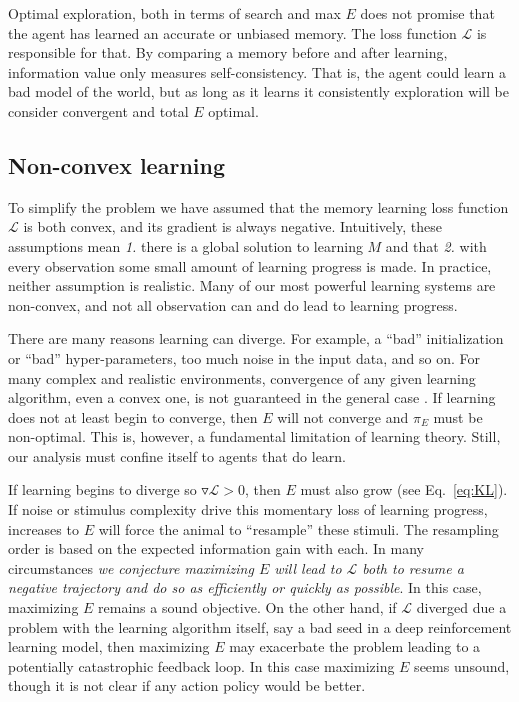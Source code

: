 \documentclass[9pt,twocolumn,twoside]{pnas-new}
\begin{document}
Optimal exploration, both in terms of search and max $E$ does not promise that the agent has learned an accurate or unbiased memory. The loss function $\mathcal{L}$ is responsible for that. By comparing a memory before and after learning, information value only measures self-consistency. That is, the agent could learn a bad model of the world, but as long as it learns it consistently exploration will be consider convergent and total $E$ optimal.

\subsection*{Non-convex learning}
To simplify the problem we have assumed that the memory learning loss function $\mathcal{L}$ is both convex, and its gradient is always negative. Intuitively, these assumptions mean \textit{1.} there is a global solution to learning $M$ and that \textit{2.} with every observation some small amount of learning progress is made. In practice, neither assumption is realistic. Many of our most powerful learning systems are non-convex, and not all observation can and do lead to learning progress. 

There are many reasons learning can diverge. For example, a ``bad'' initialization or ``bad'' hyper-parameters, too much noise in the input data, and so on. For many complex and realistic environments, convergence of any given learning algorithm, even a convex one, is not guaranteed in the general case \cite{TODO}. If learning does not at least begin to converge, then $E$ will not converge and $\pi_E$ must be non-optimal. This is, however, a fundamental limitation of learning theory. Still, our analysis must confine itself to agents that do learn.

If learning begins to diverge so $\triangledown \mathcal{L} > 0$, then $E$ must also grow (see Eq.~\ref{eq:KL}). If noise or stimulus complexity drive this momentary loss of learning progress, increases to $E$ will force the animal to ``resample'' these stimuli. The resampling order is based on the expected information gain with each. In many circumstances \textit{we conjecture maximizing $E$ will lead to $\mathcal{L}$ both to resume a negative trajectory and do so as efficiently or quickly as possible}. In this case, maximizing $E$ remains a sound objective. On the other hand, if $\mathcal{L}$ diverged due a problem with the learning algorithm itself, say a bad seed in a deep reinforcement learning model, then maximizing $E$ may exacerbate the problem leading to a potentially catastrophic feedback loop. In this case maximizing $E$ seems unsound, though it is not clear if any action policy would be better. 
\end{document}
